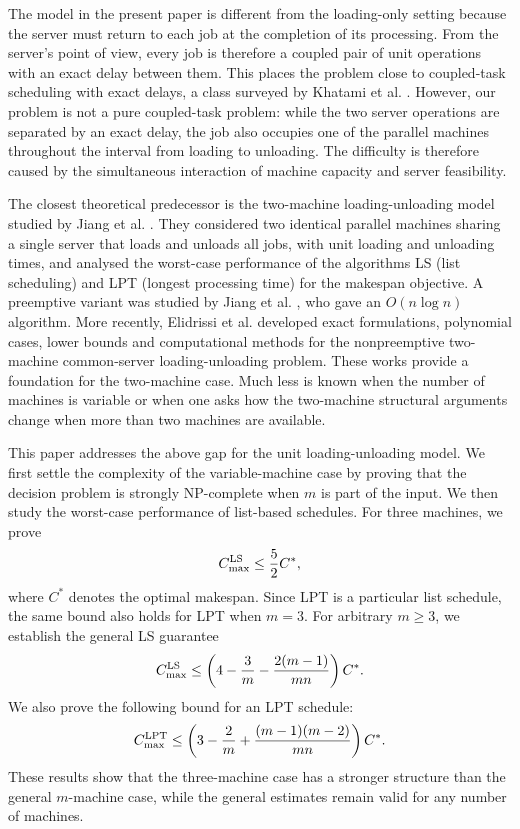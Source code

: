 \documentclass[11pt]{article}
\begin{document}
The model in the present paper is different from the loading-only setting
because the server must return to each job at the completion of its processing.
From the server's point of view, every job is therefore a coupled pair of unit
operations with an exact delay between them. This places the problem close to
coupled-task scheduling with exact delays, a class surveyed by Khatami et al. \cite{KhatamiSalehipourCheng2020}. However, our problem is
not a pure coupled-task problem: while the two server operations are separated
by an exact delay, the job also occupies one of the parallel machines throughout
the interval from loading to unloading. The difficulty is therefore caused by
the simultaneous interaction of machine capacity and server feasibility.

The closest theoretical predecessor is the two-machine loading-unloading model
studied by Jiang et al. \cite{JiangZhangHuDongJi2015}. They considered two
identical parallel machines sharing a single server that loads and unloads all
jobs, with unit loading and unloading times, and analysed the worst-case
performance of the algorithms LS (list scheduling) and LPT (longest processing time) 
for the makespan objective. A preemptive variant was
studied by Jiang et al. \cite{JiangWangZhou2014}, who gave an
\(O(n\log n)\) algorithm. More recently, Elidrissi et al.
\cite{ElidrissiBenmansourHasaniWerner2024} developed exact formulations,
polynomial cases, lower bounds and computational methods for the nonpreemptive
two-machine common-server loading-unloading problem. These works provide a
foundation for the two-machine case. Much less is known when the number of
machines is variable or when one asks how the two-machine structural arguments
change when more than two machines are available.

This paper addresses the above gap for the unit loading-unloading model. We first
settle the complexity of the variable-machine case by proving that the decision
problem is strongly NP-complete when \(m\) is part of the input. We then study the
worst-case performance of list-based schedules. For three machines, we prove
\[
        C_{\max}^{\rm LS}\le \frac52 C^* ,
\]
where $C^*$ denotes the optimal makespan. 
Since LPT is a particular list schedule, the same bound also holds for LPT when
\(m=3\). For arbitrary \(m\ge3\), we establish the general LS guarantee
\[
        C_{\max}^{\rm LS}
        \le
        \left(
        4-\frac3m-\frac{2(m-1)}{mn}
        \right) C^* .
\]
We also prove the following bound for an LPT schedule:
\[
        C_{\max}^{\rm LPT}
        \le
        \left(
        3-\frac2m+\frac{(m-1)(m-2)}{mn}
        \right)C^*.
\]
These results show that the three-machine case has a stronger structure than
the general \(m\)-machine case, while the general estimates remain valid for any
number of machines.
\end{document}
